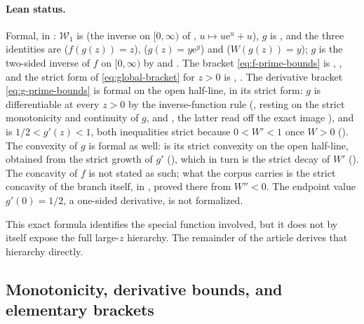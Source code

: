 \documentclass[11pt,a4paper]{article}
\numberwithin{equation}{section}
\theoremstyle{definition}
\theoremstyle{remark}
\newcommand{\e}{\mathrm e}
\newcommand{\rW}{\mathcal W}
\begin{document}
\paragraph{Lean status.}
Formal, in : \(\rW_1\) is 
(the inverse on \([0,\infty)\) of , \(u\mapsto u\e^u+u\)), \(g\) is
, and the three identities are
 (\(f(g(z))=z\)),
 (\(g(z)=y\e^y\)) and
 (\(W(g(z))=y\)); \(g\) is the two-sided
inverse of \(f\) on \([0,\infty)\) by  and
.  The bracket \eqref{eq:f-prime-bounds} is
, , and the
strict form of \eqref{eq:global-bracket} for \(z>0\) is ,
.  The derivative bracket
\eqref{eq:g-prime-bounds} is formal on the open half-line, in its strict form: \(g\) is
differentiable at every \(z>0\) by the inverse-function rule
(, resting on the strict monotonicity and continuity of
\(g\),  and ,
the latter read off the exact image ), and
 is \(1/2<g'(z)<1\), both inequalities strict because
\(0<W'<1\) once \(W>0\) ().  The convexity of
\(g\) is formal as well:  is its strict convexity on
the open half-line, obtained from the strict growth of \(g'\)
(), which in turn is the strict decay of \(W'\)
().  The concavity of \(f\) is not stated as such;
what the corpus carries is the strict concavity of the branch itself,
 in , proved there
from \(W''<0\).  The endpoint value \(g'(0)=1/2\), a one-sided derivative, is not formalized.

This exact formula identifies the special function involved, but it does
not by itself expose the full large-\(z\) hierarchy.  The remainder of the
article derives that hierarchy directly.

\subsection{Monotonicity, derivative bounds, and elementary brackets}
\end{document}
